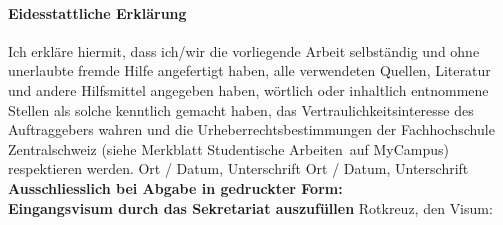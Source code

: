 

\paragraph{\textbf{Eidesstattliche Erkl\"arung}}
Ich erkl\"are hiermit, dass ich/wir die vorliegende Arbeit selbst\"andig und ohne unerlaubte fremde Hilfe angefertigt haben, alle verwendeten Quellen, Literatur und andere Hilfsmittel angegeben haben, w\"ortlich oder inhaltlich entnommene Stellen als solche kenntlich gemacht haben, das Vertraulichkeitsinteresse des Auftraggebers wahren und die Urheberrechtsbestimmungen der Fachhochschule Zentralschweiz (siehe Merkblatt \flqq Studentische Arbeiten\frqq\ auf MyCampus) respektieren werden. \newline \newline
Ort / Datum, Unterschrift	\underline{\hspace*{8cm}} \newline \newline
Ort / Datum, Unterschrift	\underline{\hspace*{8cm}} \newline \newline \newline
\textbf{Ausschliesslich bei Abgabe in gedruckter Form: \\
Eingangsvisum durch das Sekretariat auszuf\"ullen}\newline \newline
Rotkreuz, den	\underline{\hspace*{4cm}}	\hspace*{1cm} Visum:	\underline{\hspace*{4cm}}

\newpage